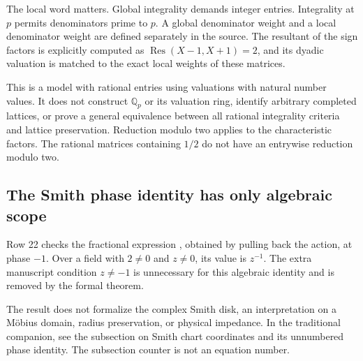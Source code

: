 The local word matters. Global integrality demands integer entries. Integrality at $p$ permits denominators prime to $p$. A global denominator weight and a local denominator weight are defined separately in the source. The resultant of the sign factors is explicitly computed as $\operatorname{Res}(X-1,X+1)=2$, and its dyadic valuation is matched to the exact local weights of these matrices.

This is a model with rational entries using valuations with natural number values. It does not construct $\mathbb Q_p$ or its valuation ring, identify arbitrary completed lattices, or prove a general equivalence between all rational integrality criteria and lattice preservation. Reduction modulo two applies to the characteristic factors. The rational matrices containing $1/2$ do not have an entrywise reduction modulo two.

\subsection{The Smith phase identity has only algebraic scope}

Row 22 checks the fractional expression , obtained by pulling back the action, at phase $-1$. Over a field with $2\ne0$ and $z\ne0$, its value is $z^{-1}$. The extra manuscript condition $z\ne-1$ is unnecessary for this algebraic identity and is removed by the formal theorem.

The result does not formalize the complex Smith disk, an interpretation on a M\"obius domain, radius preservation, or physical impedance. In the traditional companion, see the subsection on Smith chart coordinates and its unnumbered phase identity. The subsection counter is not an equation number.

